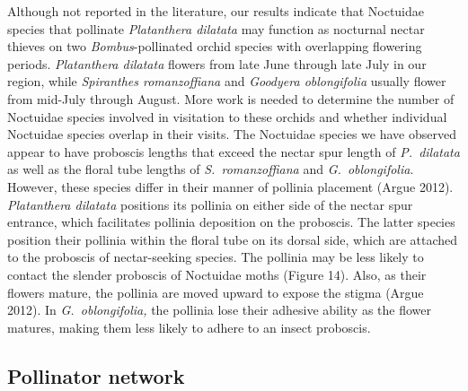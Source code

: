 \begin{multicols}{2}
Although not reported in the literature, our results indicate that
Noctuidae species that pollinate \emph{Platanthera dilatata} may
function as nocturnal nectar thieves on two \emph{Bombus}-pollinated
orchid species with overlapping flowering periods. \emph{Platanthera
dilatata} flowers from late June through late July in our region, while
\emph{Spiranthes romanzoffiana} and \emph{Goodyera oblongifolia} usually
flower from mid-July through August. More work is needed to determine
the number of Noctuidae species involved in visitation to these orchids
and whether individual Noctuidae species overlap in their visits. The
Noctuidae species we have observed appear to have proboscis lengths that
exceed the nectar spur length of \emph{P.\ dilatata} as well as the
floral tube lengths of \emph{S.\ romanzoffiana} and \emph{G.\
oblongifolia}. However, these species differ in their manner of pollinia
placement (Argue 2012). \emph{Platanthera dilatata} positions its
pollinia on either side of the nectar spur entrance, which facilitates
pollinia deposition on the proboscis. The latter species position their
pollinia within the floral tube on its dorsal side, which are attached
to the proboscis of nectar-seeking species. The pollinia may be less
likely to contact the slender proboscis of Noctuidae moths (Figure 14).
Also, as their flowers mature, the pollinia are moved upward to expose
the stigma (Argue 2012). In \emph{G.\ oblongifolia,} the pollinia lose
their adhesive ability as the flower matures, making them less likely to
adhere to an insect proboscis.

\subsection{Pollinator network}


\end{multicols}
